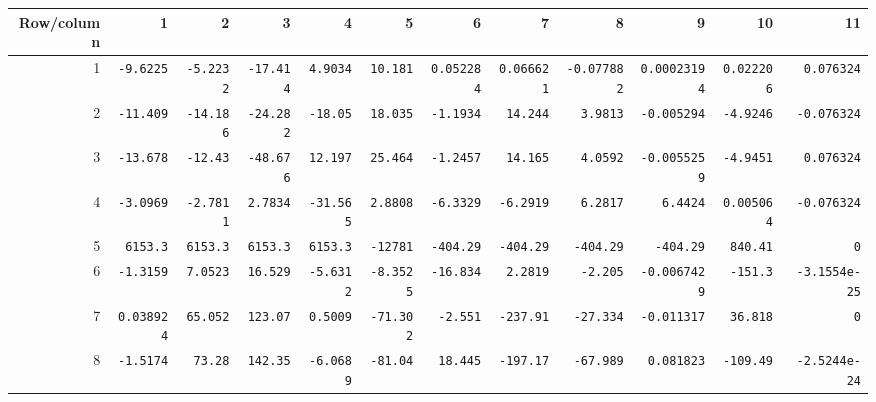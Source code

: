 \begin{landscape}
\begingroup\scriptsize\setlength{\tabcolsep}{3pt}\centering
\begin{tabular}{rrrrrrrrrrrr}\toprule

Row/column & 1 & 2 & 3 & 4 & 5 & 6 & 7 & 8 & 9 & 10 & 11 \\ \midrule

1 & \texttt{-9.6225} & \texttt{-5.2232} & \texttt{-17.414} & \texttt{4.9034} & \texttt{10.181} & \texttt{0.052284} & \texttt{0.066621} & \texttt{-0.077882} & \texttt{0.00023194} & \texttt{0.022206} & \texttt{0.076324} \\

2 & \texttt{-11.409} & \texttt{-14.186} & \texttt{-24.282} & \texttt{-18.05} & \texttt{18.035} & \texttt{-1.1934} & \texttt{14.244} & \texttt{3.9813} & \texttt{-0.005294} & \texttt{-4.9246} & \texttt{-0.076324} \\

3 & \texttt{-13.678} & \texttt{-12.43} & \texttt{-48.676} & \texttt{12.197} & \texttt{25.464} & \texttt{-1.2457} & \texttt{14.165} & \texttt{4.0592} & \texttt{-0.0055259} & \texttt{-4.9451} & \texttt{0.076324} \\

4 & \texttt{-3.0969} & \texttt{-2.7811} & \texttt{2.7834} & \texttt{-31.565} & \texttt{2.8808} & \texttt{-6.3329} & \texttt{-6.2919} & \texttt{6.2817} & \texttt{6.4424} & \texttt{0.005064} & \texttt{-0.076324} \\

5 & \texttt{6153.3} & \texttt{6153.3} & \texttt{6153.3} & \texttt{6153.3} & \texttt{-12781} & \texttt{-404.29} & \texttt{-404.29} & \texttt{-404.29} & \texttt{-404.29} & \texttt{840.41} & \texttt{0} \\

6 & \texttt{-1.3159} & \texttt{7.0523} & \texttt{16.529} & \texttt{-5.6312} & \texttt{-8.3525} & \texttt{-16.834} & \texttt{2.2819} & \texttt{-2.205} & \texttt{-0.0067429} & \texttt{-151.3} & \texttt{-3.1554e-25} \\

7 & \texttt{0.038924} & \texttt{65.052} & \texttt{123.07} & \texttt{0.5009} & \texttt{-71.302} & \texttt{-2.551} & \texttt{-237.91} & \texttt{-27.334} & \texttt{-0.011317} & \texttt{36.818} & \texttt{0} \\

8 & \texttt{-1.5174} & \texttt{73.28} & \texttt{142.35} & \texttt{-6.0689} & \texttt{-81.04} & \texttt{18.445} & \texttt{-197.17} & \texttt{-67.989} & \texttt{0.081823} & \texttt{-109.49} & \texttt{-2.5244e-24} \\


\end{tabular}
\end{landscape}
